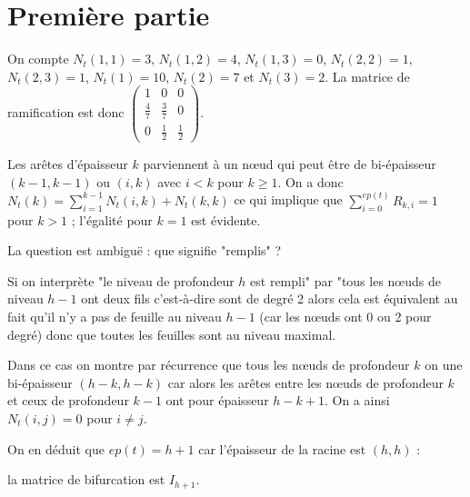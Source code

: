 \section{Première partie}
\begin{Exercise}
On compte $N_t(1,1) =3$, $N_t(1,2) =4$, $N_t(1,3) =0$, $N_t(2,2) =1$, $N_t(2,3) =1$, $N_t(1) =10$, $N_t(2) =7$ et $N_t(3) =2$. La matrice de ramification est donc $\begin{pmatrix}
  1    &   0 &  0  \\  \frac 47   &  \frac 37  & 0   \\  0  & \frac 12   &  \frac 12\end{pmatrix}$.
\end{Exercise}
\begin{Exercise}
Les arêtes d'épaisseur $k$ parviennent à un nœud qui peut être de bi-épaisseur $(k-1, k-1)$ ou $(i, k)$ avec $i < k$ pour $k\ge 1$. On a donc $\displaystyle N_t(k) = \sum_{i=1}^{k-1} N_t(i,k)+ N_t(k,k)$ ce qui implique que $\displaystyle \sum_{i=0}^{ep(t)} R_{k,i} = 1$ pour $k> 1$ ; l'égalité pour $k=1$ est évidente. 
\end{Exercise}
\begin{Exercise}
La question est ambiguë : que signifie "remplis" ?

Si on interprète "le niveau de profondeur $h$ est rempli" par "tous les nœuds de niveau $h-1$ ont deux fils c'est-à-dire sont de degré 2 alors cela est équivalent au fait qu'il n'y a pas de feuille au niveau $h-1$ (car les nœuds ont 0 ou 2 pour degré) donc que toutes les feuilles sont au niveau maximal.

Dans ce cas on montre par récurrence que tous les nœuds de profondeur $k$ on une bi-épaisseur $(h-k, h-k)$ car alors les arêtes entre les nœuds de profondeur $k$ et ceux de profondeur $k-1$ ont pour épaisseur $h - k +1$. On a ainsi $N_t(i, j)= 0$ pour $i\ne j$.

On en déduit que $ep(t) = h+1$ car l'épaisseur de la racine est $(h,h)$ :

 la matrice de bifurcation est $I_{h+1}$.
\end{Exercise}
